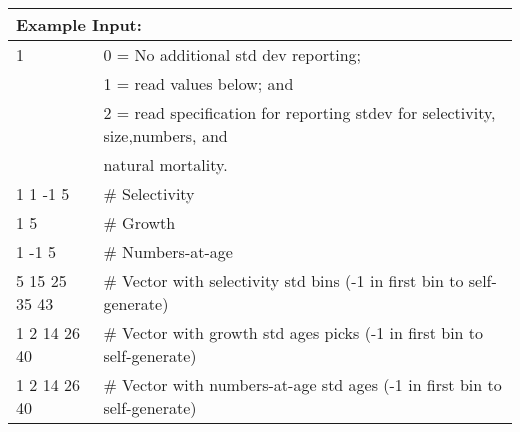 		
\begin{longtable}{p{1.1cm} p{1.4cm} p{1.2cm} p{1.2cm} p{1.3cm} p{1.6cm} p{1.4cm} p{1.4cm} p{1.4cm}}
	
	\hline
	\multicolumn{9}{l}{Example Input:}\Tstrut\Bstrut\\
	\hline
	
	\multicolumn{3}{l}{1} & \multicolumn{6}{l}{0 = No additional std dev reporting;} \Tstrut\\
	\multicolumn{3}{l}{ } & \multicolumn{6}{l}{1 = read values below; and}\Bstrut\\
	\multicolumn{3}{l}{ } & \multicolumn{6}{l}{2 = read specification for reporting stdev for selectivity, size,numbers, and }\Bstrut\\
	\multicolumn{3}{l}{ } & \multicolumn{6}{l}{natural mortality.}\Bstrut\\
	\hline
	
	\multicolumn{4}{l}{ 1 1 -1 5} & \multicolumn{5}{l}{\# Selectivity} \Bstrut\\
	\multicolumn{4}{l}{ 1 5}      & \multicolumn{5}{l}{\# Growth} \Bstrut\\
	\multicolumn{4}{l}{1 -1 5}    & \multicolumn{5}{l}{\# Numbers-at-age} \Bstrut\\

	\multicolumn{4}{l}{5 15 25 35 43} & \multicolumn{5}{l}{\# Vector with selectivity std bins (-1 in first bin to self-generate)}\Bstrut\\
	\multicolumn{4}{l}{1 2 14 26 40}  & \multicolumn{5}{l}{\# Vector with growth std ages picks (-1 in first bin to self-generate)}\Bstrut\\
	\multicolumn{4}{l}{1 2 14 26 40}  & \multicolumn{5}{l}{\# Vector with numbers-at-age std ages (-1 in first bin to self-generate)}\Bstrut\\
	 
		
	
	
	

\end{longtable}
